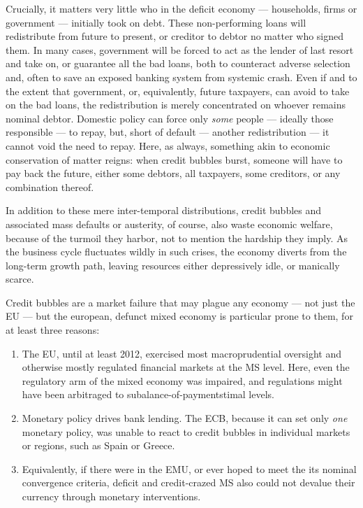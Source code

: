 \documentclass[11pt,a4paper,oneside,openright]{article}
\begin{document}
\begin{description}
\begin{enumerate}
		Crucially, it matters very little who in the deficit economy --- households, firms or government --- initially took on debt. 
		These non-performing loans will redistribute from future to present, or creditor to debtor no matter who signed them. 
		In many cases, government will be forced to act as the lender of last resort and take on, or guarantee all the bad loans, both to counteract adverse selection and, often to save an exposed banking system from systemic crash. 
		Even if and to the extent that government, or, equivalently, future taxpayers, can avoid to take on the bad loans, the redistribution is merely concentrated on whoever remains nominal debtor. 
		Domestic policy can force only \emph{some} people --- ideally those responsible --- to repay, but, short of default --- another redistribution --- it cannot void the need to repay. 
		Here, as always, something akin to economic conservation of matter reigns: 
		when credit bubbles burst, someone will have to pay back the future, either some debtors, all taxpayers, some creditors, or any combination thereof.
		
		In addition to these mere inter-temporal distributions, credit bubbles and associated mass defaults or austerity, of course, also waste economic welfare, because of the turmoil they harbor, not to mention the hardship they imply. 
		As the business cycle fluctuates wildly in such crises, the economy diverts from the long-term growth path, leaving resources either depressively idle, or manically scarce.
		
		Credit bubbles are a market failure that may plague any economy --- not just the \gls{EU} --- but the european, defunct mixed economy is particular prone to them, for at least three reasons:
		\begin{enumerate}
			\item The \gls{EU}, until at least 2012, exercised most macroprudential oversight and otherwise mostly regulated financial markets at the \gls{MS} level. 
			Here, even the regulatory arm of the mixed economy was impaired, and regulations might have been arbitraged to subalance-of-paymentstimal levels. %
			\item Monetary policy drives bank lending. 
			The \gls{ECB}, because it can set only \emph{one} monetary policy, was unable to react to credit bubbles in individual markets or regions, such as Spain or Greece. 
			\item Equivalently, if there were in the \gls{EMU}, or ever hoped to meet the its nominal convergence criteria, deficit and credit-crazed \gls{MS} also could not devalue their currency through monetary interventions.
		\end{enumerate}
	\end{enumerate}
	

\end{description}
\end{document}
